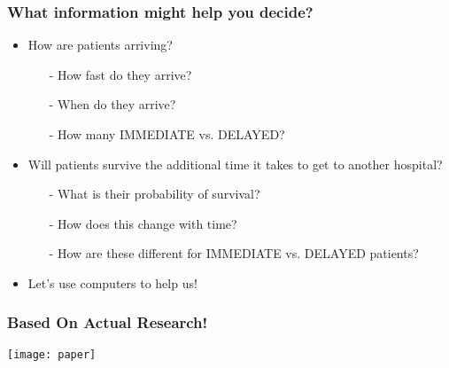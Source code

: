 \documentclass{beamer}
\begin{document}
\begin{frame}
  \frametitle{What information might help you decide?}
  \pause
  \begin{itemize}
    \item How are patients arriving?
    \begin{itemize}
      \item[-] How fast do they arrive?
      \item[-] When do they arrive?
      \item[-] How many IMMEDIATE vs. DELAYED?
    \end{itemize}
  \end{itemize}
  \pause
  \begin{itemize}
    \item Will patients survive the additional time it takes to get to another hospital?
    \begin{itemize}
      \item[-] What is their probability of survival?
      \item[-] How does this change with time?
      \item[-] How are these different for IMMEDIATE vs. DELAYED patients?
    \end{itemize}
    \pause
    \item Let's use computers to help us!
  \end{itemize}
\end{frame}

\begin{frame}
  \frametitle{Based On Actual Research!}
  \centering
  \texttt{[image: paper]}
\end{frame}


\end{document}
